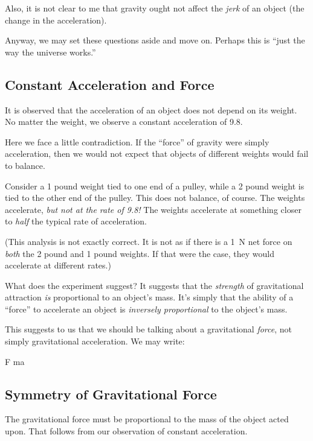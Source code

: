 Also, it is not clear to me that gravity ought not affect the
\emph{jerk} of an object (the change in the acceleration).

Anyway, we may set these questions aside and move on. Perhaps this is
``just the way the universe works.''

\subsection{Constant Acceleration and Force}

It is observed that the acceleration of an object does not depend on its
weight. No matter the weight, we observe a constant acceleration of
\SI{9.8}{\mpss}.

Here we face a little contradiction. If the ``force'' of gravity were
simply acceleration, then we would not expect that objects of different
weights would fail to balance.

Consider a 1 pound weight tied to one end of a pulley, while a 2 pound
weight is tied to the other end of the pulley. This does not balance, of
course. The weights accelerate, \emph{but not at the rate of
\SI{9.8}{\mpss}!} The weights accelerate at something closer to
\emph{half} the typical rate of acceleration.

(This analysis is not exactly correct. It is not as if there is a
\SI{1}{N} net force on \emph{both} the 2 pound and 1 pound weights. If
that were the case, they would accelerate at different rates.)

What does the experiment suggest? It suggests that the \emph{strength}
of gravitational attraction \emph{is} proportional to an object's mass.
It's simply that the ability of a ``force'' to accelerate an object is
\emph{inversely proportional} to the object's mass.

This suggests to us that we should be talking about a gravitational
\emph{force}, not simply gravitational acceleration. We may write:

\begin{nedqn}
  F
\eqcol
  ma
\end{nedqn}

\subsection{Symmetry of Gravitational Force}

The gravitational force must be proportional to the mass of the object
acted upon. That follows from our observation of constant acceleration.

